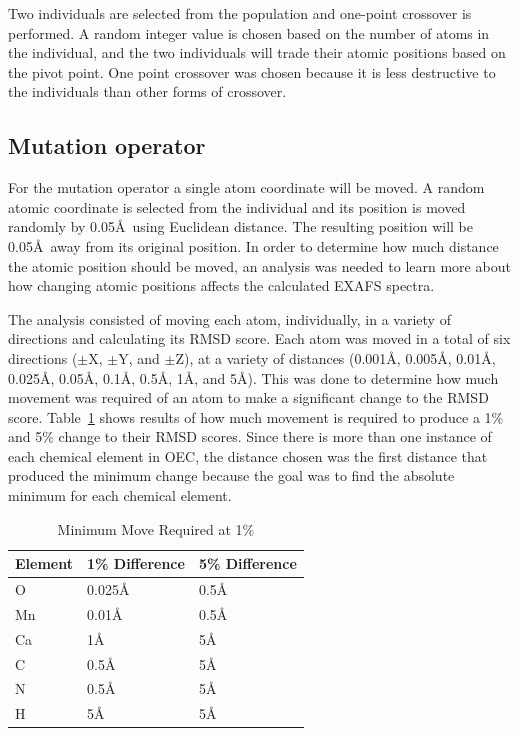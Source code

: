 \documentclass[conference]{IEEEtran}
\begin{document}
Two individuals are selected from the population and one-point crossover is performed. A random integer value is chosen based on the number of atoms in the individual, and the two individuals will trade their atomic positions based on the pivot point. One point crossover was chosen because it is less destructive to the individuals than other forms of crossover.

\subsection{Mutation operator}
\label{subsec:mutation}

For the mutation operator a single atom coordinate will be moved. A random atomic coordinate is selected from the individual and its position is moved randomly by 0.05\AA\  using Euclidean distance. The resulting position will be 0.05\AA\ away from its original position. In order to determine how much distance the atomic position should be moved, an analysis was needed to learn more about how changing atomic positions affects the calculated EXAFS spectra.

The analysis consisted of moving each atom, individually, in a variety of directions and calculating its RMSD score. Each atom was moved in a total of six directions ($\pm$X, $\pm$Y, and $\pm$Z), at a variety of distances (0.001\AA, 0.005\AA, 0.01\AA, 0.025\AA, 0.05\AA, 0.1\AA, 0.5\AA, 1\AA, and 5\AA). This was done to determine how much movement was required of an atom to make a significant change to the RMSD score. Table~\ref{table:minMove} shows results of how much movement is required to produce a 1\% and 5\% change to their RMSD scores. Since there is more than one instance of each chemical element in OEC, the distance chosen was the first distance that produced the minimum change because the goal was to find the absolute minimum for each chemical element.

\begin{table}
\caption{Minimum Move Required at 1\%}
\label{table:minMove}
\centering
\normalsize
\begin{tabular}{ | l | l | l | }
  \hline
    Element & 1\% Difference & 5\% Difference \\ \hline
    O & 0.025\AA & 0.5\AA \\ \hline
    Mn & 0.01\AA & 0.5\AA \\ \hline
    Ca & 1\AA & 5\AA \\ \hline
    C & 0.5\AA & 5\AA \\ \hline
    N & 0.5\AA & 5\AA \\ \hline
    H & 5\AA & 5\AA \\ \hline
\end{tabular}
\end{table}
\end{document}
